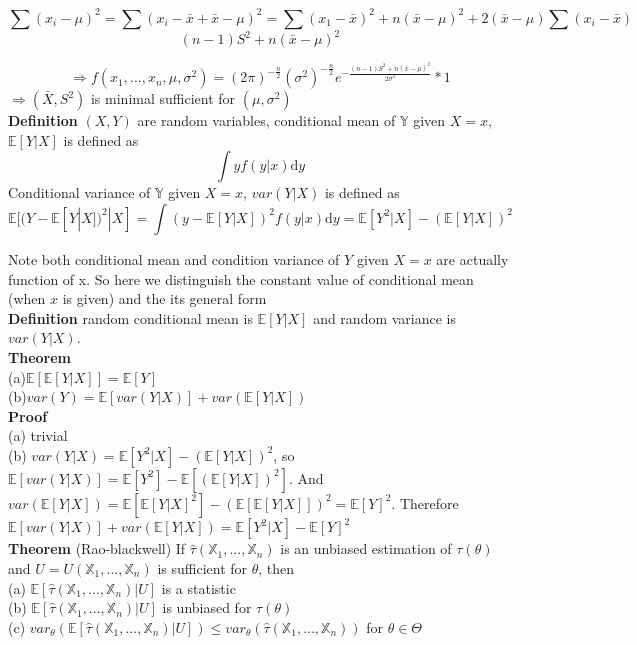 $$\sum(x_i-\mu)^2 = \sum(x_i-\bar{x}+\bar{x}-\mu)^2 = \sum(x_1-\bar{x})^2 + n(\bar{x}-\mu)^2+2(\bar{x}-\mu)\sum(x_i-\bar{x})$$
$$(n-1)S^2+n(\bar{x}-\mu)^2$$

$$\Rightarrow f(x_1, ..., x_n, \mu, \sigma^2 ) = (2\pi)^{-\frac{n}{2}}(\sigma^2)^{-\frac{n}{2}}e^{-\frac{(n-1)S^2+n(\bar{x}-\mu)^2}{2\sigma^2}} * 1$$
$\Rightarrow (\bar{X}, S^2) $ is minimal sufficient for $ (\mu, \sigma^2) $\\

\textbf{Definition} $(X, Y)$ are random variables, conditional mean of $\mathbb{Y}$ given $X=x$, $\mathbb{E}[Y|X]$ is defined as
$$\int yf(y|x) \mathrm{d}y$$
Conditional variance of $\mathbb{Y}$ given $X=x$, $var(Y|X)$ is defined as
$$\mathbb{E}[ (Y - \mathbb{E}[Y|X])^2 |X ] = \int (y-\mathbb{E}[Y|X])^2 f(y|x) \mathrm{d}y = 
\mathbb{E}[ Y^2 |X ] - (\mathbb{E}[Y|X])^2$$

Note both conditional mean and condition variance of $Y$ given $X=x$ are actually function of x. So here we distinguish the constant value of conditional mean (when $x$ is given) and the its general form\\

\textbf{Definition} random conditional mean is $\mathbb{E}[Y|X]$ and random variance is $var(Y|X)$.\\

\textbf{Theorem}\\
(a)$\mathbb{E}[\mathbb{E}[Y|X]] = \mathbb{E}[Y]$\\
(b)$var(Y) = \mathbb{E}[var(Y|X)]+var(\mathbb{E}[Y|X])$\\

\textbf{Proof}\\
(a) trivial\\
(b) $var(Y|X) = \mathbb{E}[ Y^2 |X ] - (\mathbb{E}[Y|X])^2$, so $\mathbb{E}[var(Y|X)] = \mathbb{E}[Y^2] - \mathbb{E}[(\mathbb{E}[Y|X])^2]$. And $var(\mathbb{E}[Y|X]) = \mathbb{E}[ \mathbb{E}[Y|X]^2 ] - (\mathbb{E}[\mathbb{E}[Y|X]])^2 = \mathbb{E}[Y]^2$. Therefore $\mathbb{E}[var(Y|X)]+var(\mathbb{E}[Y|X]) = \mathbb{E}[ Y^2 |X ] - \mathbb{E}[Y]^2$\\

\textbf{Theorem} (Rao-blackwell) If $\hat{\tau}(\mathbb{X}_1, ..., \mathbb{X}_n)$ is an unbiased estimation of $\tau(\theta)$ and $U = U(\mathbb{X}_1, ..., \mathbb{X}_n)$ is sufficient for $\theta$, then\\
(a) $\mathbb{E}[ \hat{\tau}(\mathbb{X}_1, ..., \mathbb{X}_n) | U ]$ is a statistic\\
(b) $\mathbb{E}[ \hat{\tau}(\mathbb{X}_1, ..., \mathbb{X}_n) | U ]$ is unbiased for $\tau(\theta)$\\
(c) $var_\theta( \mathbb{E}[ \hat{\tau}(\mathbb{X}_1, ..., \mathbb{X}_n) | U ] )\leq var_\theta( \hat{\tau}(\mathbb{X}_1, ..., \mathbb{X}_n) )$ for $\theta\in\Theta$\\

